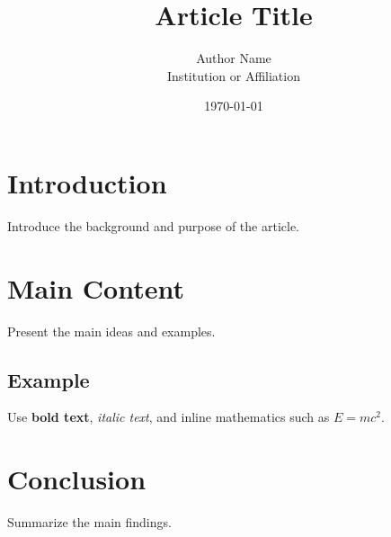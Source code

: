\documentclass[11pt,a4paper]{article}
\title{Article Title}
\author{Author Name\\Institution or Affiliation}
\date{\today}
\begin{document}
\maketitle
\tableofcontents

\section{Introduction}
Introduce the background and purpose of the article.

\section{Main Content}
Present the main ideas and examples.

\subsection{Example}
Use \textbf{bold text}, \textit{italic text}, and inline mathematics such as $E = mc^2$.

\section{Conclusion}
Summarize the main findings.
\end{document}
